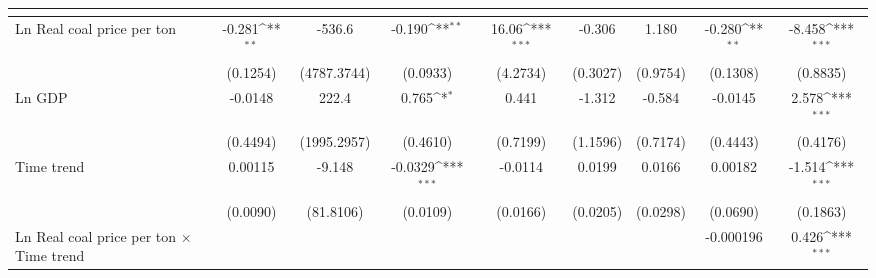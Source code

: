 {
\def\sym#1{\ifmmode^{#1}\else\(^{#1}\)\fi}
\begin{tabular}{l*{8}{c}}
\toprule
                    &&&&&&&&\\
\midrule
Ln Real coal price per ton&      -0.281\sym{**} &      -536.6         &      -0.190\sym{**} &       16.06\sym{***}&      -0.306         &       1.180         &      -0.280\sym{**} &      -8.458\sym{***}\\
                    &    (0.1254)         & (4787.3744)         &    (0.0933)         &    (4.2734)         &    (0.3027)         &    (0.9754)         &    (0.1308)         &    (0.8835)         \\
\addlinespace
Ln GDP              &     -0.0148         &       222.4         &       0.765\sym{*}  &       0.441         &      -1.312         &      -0.584         &     -0.0145         &       2.578\sym{***}\\
                    &    (0.4494)         & (1995.2957)         &    (0.4610)         &    (0.7199)         &    (1.1596)         &    (0.7174)         &    (0.4443)         &    (0.4176)         \\
\addlinespace
Time trend          &     0.00115         &      -9.148         &     -0.0329\sym{***}&     -0.0114         &      0.0199         &      0.0166         &     0.00182         &      -1.514\sym{***}\\
                    &    (0.0090)         &   (81.8106)         &    (0.0109)         &    (0.0166)         &    (0.0205)         &    (0.0298)         &    (0.0690)         &    (0.1863)         \\
\addlinespace
Ln Real coal price per ton $\times$ Time trend&                     &                     &                     &                     &                     &                     &   -0.000196         &       0.426\sym{***}\\

\end{tabular}}
